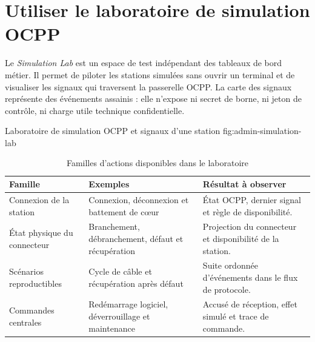 

\section{Utiliser le laboratoire de simulation OCPP}

Le \emph{Simulation Lab} est un espace de test indépendant des tableaux de
bord métier. Il permet de piloter les stations simulées sans ouvrir un terminal
et de visualiser les signaux qui traversent la passerelle OCPP. La carte des
signaux représente des événements assainis : elle n'expose ni secret de borne,
ni jeton de contrôle, ni charge utile technique confidentielle.

  {Laboratoire de simulation OCPP et signaux d'une station}
  {fig:admin-simulation-lab}

\begin{table}[H]
  \centering
  \caption{Familles d'actions disponibles dans le laboratoire}
  \label{tab:simulation-lab-actions}
  \begin{tabularx}{\textwidth}{|L{4cm}|Y|Y|}
    \hline
    \textbf{Famille} & \textbf{Exemples} & \textbf{Résultat à observer} \\ \hline
    Connexion de la station & Connexion, déconnexion et battement de cœur &
    État OCPP, dernier signal et règle de disponibilité. \\ \hline
    État physique du connecteur & Branchement, débranchement, défaut et
    récupération & Projection du connecteur et disponibilité de la station.
    \\ \hline
    Scénarios reproductibles & Cycle de câble et récupération après défaut &
    Suite ordonnée d'événements dans le flux de protocole. \\ \hline
    Commandes centrales & Redémarrage logiciel, déverrouillage et maintenance &
    Accusé de réception, effet simulé et trace de commande. \\ \hline
  \end{tabularx}
\end{table}

